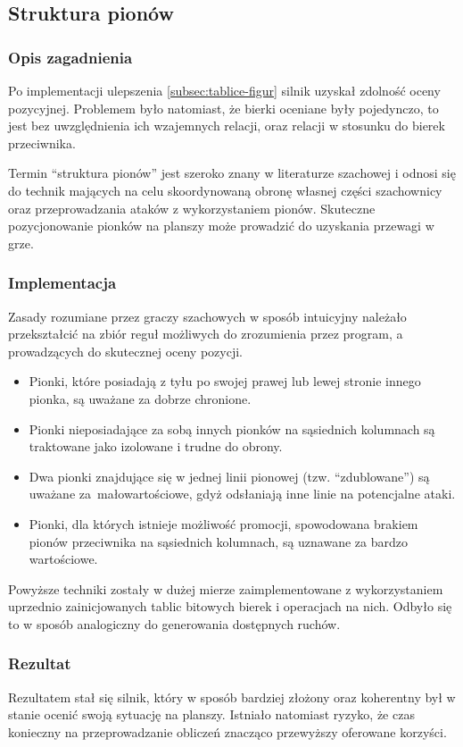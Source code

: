 \subsection{Struktura pionów}
\label{subsec:struktura-pionow}

\subsubsection{Opis zagadnienia}
Po implementacji ulepszenia \ref{subsec:tablice-figur} silnik uzyskał zdolność oceny pozycyjnej.
Problemem było natomiast, że bierki oceniane były pojedynczo, to jest bez uwzględnienia ich wzajemnych relacji, oraz relacji w stosunku do bierek przeciwnika.

Termin \enquote{struktura pionów} jest szeroko znany w literaturze szachowej \cite*{stuktura-pionow} i odnosi się do technik mających na celu skoordynowaną obronę własnej części szachownicy oraz przeprowadzania ataków z wykorzystaniem pionów.
Skuteczne pozycjonowanie pionków na planszy może prowadzić do uzyskania przewagi w grze.

\subsubsection{Implementacja}
Zasady rozumiane przez graczy szachowych w sposób intuicyjny należało przekształcić na zbiór reguł możliwych do zrozumienia przez program, a prowadzących do skutecznej oceny pozycji.
\begin{itemize}
    \item Pionki, które posiadają z tyłu po swojej prawej lub lewej stronie innego pionka, są uważane za dobrze chronione.
    \item Pionki nieposiadające za sobą innych pionków na sąsiednich kolumnach są traktowane jako izolowane i trudne do obrony.
    \item Dwa pionki znajdujące się w jednej linii pionowej (tzw. \enquote{zdublowane}) są uważane za~małowartościowe, gdyż odsłaniają inne linie na potencjalne ataki.
    \item Pionki, dla których istnieje możliwość promocji, spowodowana brakiem pionów przeciwnika na sąsiednich kolumnach, są uznawane za bardzo wartościowe.
\end{itemize}

Powyższe techniki zostały w dużej mierze zaimplementowane z wykorzystaniem uprzednio zainicjowanych tablic bitowych bierek i operacjach na nich.
Odbyło się to w sposób analogiczny do generowania dostępnych ruchów.

\subsubsection{Rezultat}
Rezultatem stał się silnik, który w sposób bardziej złożony oraz koherentny był w stanie ocenić swoją sytuację na planszy.
Istniało natomiast ryzyko, że czas konieczny na przeprowadzanie obliczeń znacząco przewyższy oferowane korzyści.
